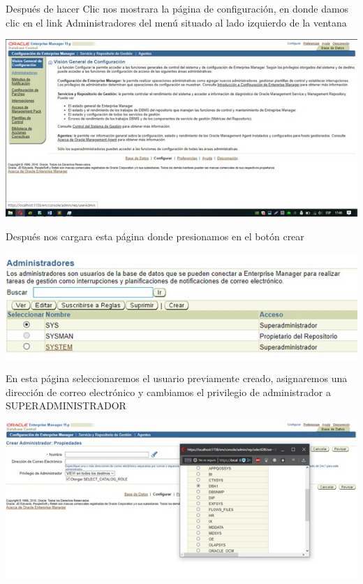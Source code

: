 \begin{flushleft}
\begin{center}
\end{center}
Después de hacer Clic nos mostrara la página de configuración, en donde damos clic en el link Administradores del menú situado al lado izquierdo de la ventana\\
\begin{center}
\includegraphics{images/image-21}\\
\end{center}
Después nos cargara esta página donde presionamos en el botón crear\\
\begin{center}
\includegraphics{images/image-22}\\
\end{center}
En esta página seleccionaremos el usuario previamente creado, asignaremos una dirección de correo electrónico y cambiamos el privilegio de administrador a SUPERADMINISTRADOR\\
\begin{center}
\includegraphics{images/image-23}\\

\end{center}
\end{flushleft}
